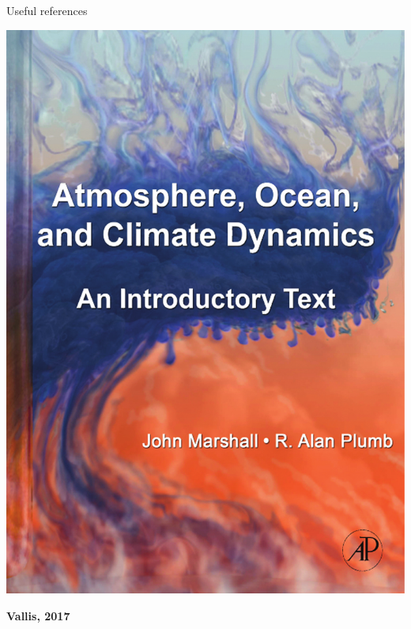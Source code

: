 \documentclass[aspectratio=169,xcolor=dvipsnames]{beamer}
\begin{document}
\begin{frame}{Useful references}
\begin{center}
\begin{minipage}{0.18\textwidth}
\begin{center}
\vspace{1em}

\includegraphics[width=1\textwidth]{figs/Fig-Book-Marshall-Plumb-2008.pdf}
\end{center}
\end{minipage}
\hspace{1em}
\begin{minipage}{0.2\textwidth}
\begin{center}
\textbf{Vallis, 2017}

\vspace{1em}


\end{center}
\end{minipage}
\end{center}
\end{frame}
\end{document}
